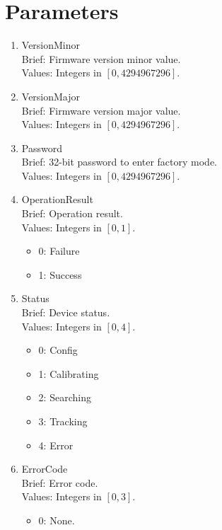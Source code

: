 \documentclass{article}
\begin{document}
\section{Parameters}
\begin{enumerate}
      \item VersionMinor
            \\ Brief: Firmware version minor value.
            \\ Values: Integers in $[0, 4294967296]$.
      \item VersionMajor
            \\ Brief: Firmware version major value.
            \\ Values: Integers in $[0, 4294967296]$.
      \item Password
            \\ Brief: 32-bit password to enter factory mode.
            \\ Values: Integers in $[0, 4294967296]$.
      \item OperationResult
            \\ Brief: Operation result.
            \\ Values: Integers in $[0, 1]$. 
            \begin{itemize}
                  \item 0: Failure
                  \item 1: Success
            \end{itemize}
      \item Status
            \\ Brief: Device status.
            \\ Values: Integers in $[0, 4]$. 
            \begin{itemize}
                  \item 0: Config
                  \item 1: Calibrating
                  \item 2: Searching
                  \item 3: Tracking
                  \item 4: Error
            \end{itemize}
      \item ErrorCode
            \\ Brief: Error code.
            \\ Values: Integers in $[0, 3]$.
            \begin{itemize}
                  \item 0: None.

\end{itemize}
\end{enumerate}
\end{document}
